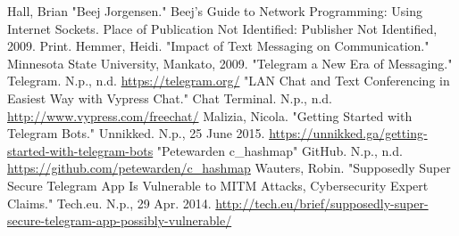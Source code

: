 \documentclass[twoside]{article}
\begin{document}
\begin{multicols}{2}
\begin{thebibliography}{99} %
Hall, Brian "Beej Jorgensen." Beej's Guide to Network Programming: Using Internet Sockets. Place of Publication Not Identified: Publisher Not Identified, 2009. Print.
Hemmer, Heidi. "Impact of Text Messaging on Communication." Minnesota State University, Mankato, 2009.
"Telegram  a New Era of Messaging." Telegram. N.p., n.d.  \href{https://telegram.org/}{https://telegram.org/}
"LAN Chat and Text Conferencing in Easiest Way with Vypress Chat." Chat Terminal. N.p., n.d.  \href{http://www.vypress.com/free\textunderscore chat/}{http://www.vypress.com/free\textunderscore chat/}
Malizia, Nicola. "Getting Started with Telegram Bots." Unnikked. N.p., 25 June 2015. \href{https://unnikked.ga/getting-started-with-telegram-bots}{https://unnikked.ga/getting-started-with-telegram-bots}
"Petewarden c\_hashmap" GitHub. N.p., n.d.  \href{https://github.com/petewarden/c\_hashmap}{https://github.com/petewarden/c\_hashmap}
Wauters, Robin. "Supposedly Super Secure Telegram App Is Vulnerable to MITM Attacks, Cybersecurity Expert Claims." Tech.eu. N.p., 29 Apr. 2014.  \href{http://tech.eu/brief/supposedly-super-secure-telegram-app-possibly-vulnerable/}{http://tech.eu/brief/supposedly-super-secure-telegram-app-possibly-vulnerable/} 

\end{thebibliography}


\end{multicols}
\end{document}
